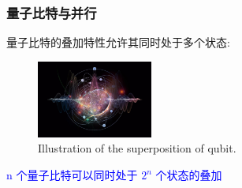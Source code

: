 \begin{frame}
    \frametitle{量子比特与并行}
        量子比特的叠加特性允许其同时处于多个状态:
            \begin{figure}
        \centering
                \includegraphics[height=1.0in, width=1.5in, viewport=0 0 1200 800,clip]{Figures/Quantum_Computing_2.jpg}
		\caption{\tiny{\textrm{Illustration of the superposition of qubit.}}}
		\label{Fig:Quantum_Computing_2}
            \end{figure}
	    \vskip -15pt
    {\fontsize{7.5pt}{5.2pt}}
    \vskip 2pt
	\textcolor{blue}{\textrm{n} 个量子比特可以同时处于 \( 2^n \) 个状态的叠加}\\
    {\fontsize{9.5pt}{5.2pt}\selectfont{\textcolor{red}{这使得量子计算机在一次操作中可以对 \( 2^n \) 个数据进行计算，实现并行计算，大大提高计算效率}}}
\end{frame}


